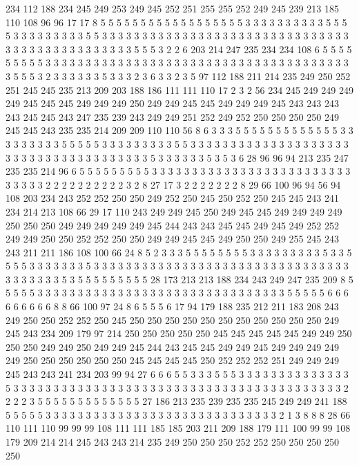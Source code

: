 234 112 188 234 245 249 253 249 245 252 251 255 255 252 249 245 239 213 185 110
108 96 96 17 17 8 5 5 5 5 5 5 5 5 5 5 5 5 5 5
5 5 5 5 3 3 3 3 3 3 3 3 3 3 5 5 5 5 3 3
3 3 3 3 3 3 3 5 5 3 3 3 3 3 3 3 3 3 3 3
3 3 3 3 3 3 3 3 3 3 3 3 3 3 3 3 3 3 3 3
3 3 3 3 3 3 3 3 3 3 3 3 3 3 3 3 5 5 5 3
2 2 6 203 214 247 235 234 234 108 6 5 5 5 5 5 5 5 5 5
3 3 3 3 3 3 3 3 3 3 3 3 3 3 3 3 3 3 3 3
3 3 3 3 3 3 3 3 3 3 3 3 3 3 3 3 3 3 3 5
5 5 3 2 3 3 3 3 3 3 5 3 3 3 2 3 6 3 3 2
3 5 97 112 188 211 214 235 249 250 252 251 245 245 235 213 209 203 188 186
111 111 110 17 2 3 2 56 234 245 249 249 249 249 245 245 245 249 249 249
250 249 249 245 245 249 249 249 245 243 243 243 243 245 245 243 247 235 239 243
249 249 251 252 249 252 250 250 250 250 249 245 245 243 235 235 214 209 209 110
110 56 8 6 3 3 3 5 5 5 5 5 5 5 5 5 5 5 5 5
3 3 3 3 3 3 3 3 3 5 5 5 5 5 3 3 3 3 3 3
3 3 3 5 5 3 3 3 3 3 3 3 3 3 3 3 3 3 3 3
3 3 3 3 3 3 3 3 3 3 3 3 3 3 3 3 3 3 3 3
3 3 3 5 3 3 3 3 3 3 5 3 5 3 6 28 96 96 94 213
235 247 235 235 214 96 6 5 5 5 5 5 5 5 5 5 3 3 3 3
3 3 3 3 3 3 3 3 3 3 3 3 3 3 3 3 3 3 3 3
3 3 3 3 3 3 2 2 2 2 2 2 2 2 2 2 3 2 8 27
17 3 2 2 2 2 2 2 2 8 29 66 100 96 94 56 94 108 203 234
243 252 252 250 250 249 252 250 245 250 252 250 245 245 243 241 234 214 213 108
66 29 17 110 243 249 249 245 250 249 245 245 249 249 249 249 250 250 250 249
249 249 249 249 245 244 243 243 245 245 249 245 249 252 252 249 249 250 250 252
252 250 250 249 249 245 245 249 250 250 249 255 245 243 243 211 211 186 108 100
66 24 8 5 2 3 3 3 5 5 5 5 5 5 5 5 3 3 3 3
3 3 3 3 3 5 3 3 5 5 5 5 3 3 3 3 3 3 3 5
3 3 3 3 3 3 3 3 3 3 3 3 3 3 3 3 3 3 3 3
3 3 3 3 3 3 3 3 3 3 3 3 3 3 3 3 3 3 3 5
3 5 5 5 5 5 5 5 5 5 28 173 213 213 188 234 243 249 247 235
209 8 5 5 5 5 5 3 3 3 3 3 3 3 3 3 3 3 3 3
3 3 3 3 3 3 3 3 3 3 3 3 3 3 3 3 3 3 5 5
5 5 5 6 6 6 6 6 6 6 6 6 8 8 66 100 97 24 8 6
5 5 5 6 17 94 179 188 235 212 211 183 208 243 249 250 250 252 252 250
245 250 250 250 250 250 250 250 250 250 250 250 249 245 243 234 209 179 97 214
250 250 250 250 250 245 245 245 245 245 249 249 250 250 250 249 249 250 249 249
245 244 243 245 245 249 249 245 249 249 249 249 249 250 250 250 250 250 250 245
245 245 245 250 252 252 252 251 249 249 249 245 243 243 241 234 203 99 94 27
6 6 6 5 5 3 3 3 5 5 5 3 3 3 3 3 3 3 3 3
3 3 3 3 3 5 3 3 3 3 3 3 3 3 3 3 3 3 3 3
3 3 3 3 3 3 3 3 3 3 3 3 3 3 3 3 3 3 3 3
3 3 3 3 3 3 3 2 2 2 2 3 5 5 5 5 5 5 5 5
5 5 5 5 5 27 186 213 235 239 235 235 245 249 249 241 188 5 5 5
5 5 3 3 3 3 3 3 3 3 3 3 3 3 3 3 3 3 3 3
3 3 3 3 3 3 3 3 3 3 3 2 1 3 8 8 8 28 66 110
111 110 99 99 99 108 111 111 185 185 203 211 209 188 179 111 100 99 99 108
179 209 214 214 245 243 243 214 235 249 250 250 250 252 252 250 250 250 250 250
